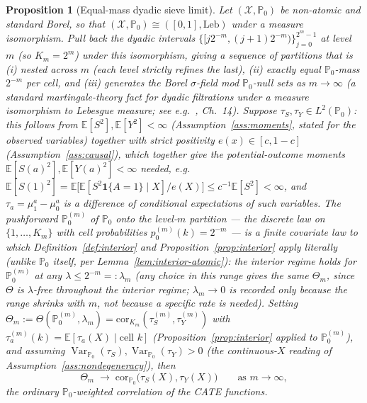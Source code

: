 \documentclass[11pt]{article}
\theoremstyle{plain}
\newtheorem{proposition}[theorem]{Proposition}
\theoremstyle{definition}
\theoremstyle{remark}
\newcommand{\E}{\mathbb{E}}
\newcommand{\PP}{\mathbb{P}}
\newcommand{\cX}{\mathcal{X}}
\newcommand{\Corr}{\mathrm{cor}}
\DeclareMathOperator{\Var}{Var}
\begin{document}
\begin{proposition}[Equal-mass dyadic sieve limit]\label{prop:sieve-limit}
Let $(\cX,\PP_0)$ be non-atomic and standard Borel, so that
$(\cX,\PP_0)\cong([0,1],\mathrm{Leb})$ under a measure isomorphism. Pull back the
dyadic intervals $\{[j2^{-m},(j+1)2^{-m})\}_{j=0}^{2^m-1}$ at level $m$ (so
$K_m=2^m$) under this isomorphism, giving a sequence of partitions that is (i)
\emph{nested} across $m$ (each level strictly refines the last), (ii) exactly equal
$\PP_0$-mass $2^{-m}$ per cell, and (iii) generates the Borel $\sigma$-field mod
$\PP_0$-null sets as $m\to\infty$ (a standard martingale-theory fact for dyadic
filtrations under a measure isomorphism to Lebesgue measure; see e.g.\
\citet{Williams1991}, Ch.\ 14). Suppose $\tau_S,\tau_Y\in L^2(\PP_0)$: this follows
from $\E[S^2],\E[Y^2]<\infty$ (Assumption~\ref{ass:moments}, stated for the observed
variables) together with strict positivity $e(x)\in[c,1-c]$
(Assumption~\ref{ass:causal}), which together give the potential-outcome moments
$\E[S(a)^2],\E[Y(a)^2]<\infty$ needed, e.g.\
$\E[S(1)^2]=\E\big[\E[S^2\mathbf1\{A=1\}\mid X]/e(X)\big]\le c^{-1}\E[S^2]<\infty$,
and $\tau_a=\mu_1^a-\mu_0^a$ is a difference of conditional expectations of such
variables. \emph{The pushforward $\PP_0^{(m)}$ of $\PP_0$ onto the level-$m$
partition} --- the discrete law on $\{1,\dots,K_m\}$ with cell probabilities
$p_0^{(m)}(k)=2^{-m}$ --- is a finite covariate law to which
Definition~\ref{def:interior} and Proposition~\ref{prop:interior} apply literally
(unlike $\PP_0$ itself, per Lemma~\ref{lem:interior-atomic}): the interior regime
holds for $\PP_0^{(m)}$ at any $\lambda\le2^{-m}=:\lambda_m$ (any choice in this
range gives the same $\Theta_m$, since $\Theta$ is $\lambda$-free throughout the
interior regime; $\lambda_m\to0$ is recorded only because the range shrinks with
$m$, not because a specific rate is needed). Setting
$\Theta_m:=\Theta(\PP_0^{(m)},\lambda_m)=\Corr_{K_m}(\tau_S^{(m)},\tau_Y^{(m)})$
with $\tau_a^{(m)}(k)=\E[\tau_a(X)\mid\text{cell }k]$ (Proposition~\ref{prop:interior}
applied to $\PP_0^{(m)}$), and assuming $\Var_{\PP_0}(\tau_S),\Var_{\PP_0}(\tau_Y)>0$
(the continuous-$X$ reading of Assumption~\ref{ass:nondegeneracy}), then
\begin{equation}\label{eq:sieve-limit}
    \Theta_m \;\longrightarrow\; \Corr_{\PP_0}\big(\tau_S(X),\tau_Y(X)\big)
    \qquad\text{as } m\to\infty,
\end{equation}
the ordinary $\PP_0$-weighted correlation of the CATE functions.
\end{proposition}
\end{document}
